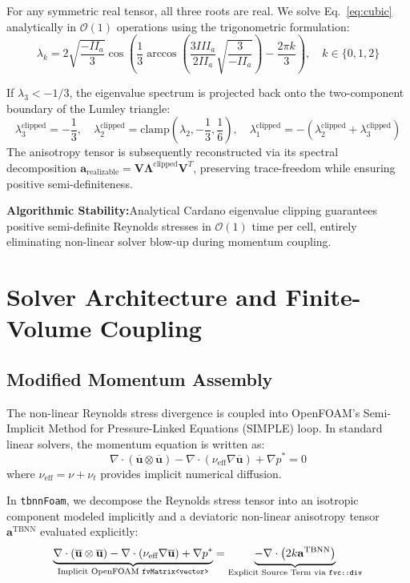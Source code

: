 \documentclass[11pt,a4paper]{article}
\newcommand{\takeaway}[2]{%
  \vspace{4pt}\noindent\colorbox{navyblue!6}{%
    \parbox{\dimexpr\textwidth-2\fboxsep\relax}{%
      \vspace{3pt}\textbf{\color{navyblue}#1:}\hspace{0.5em}#2\vspace{3pt}%
    }%
  }\vspace{4pt}%
}
\begin{document}
For any symmetric real tensor, all three roots are real. We solve Eq.~\ref{eq:cubic} analytically in $\mathcal{O}(1)$ operations using the trigonometric formulation:
\begin{equation}
\lambda_k = 2\sqrt{\frac{-II_a}{3}} \cos\left(\frac{1}{3}\arccos\left(\frac{3 III_a}{2 II_a}\sqrt{\frac{3}{-II_a}}\right) - \frac{2\pi k}{3}\right), \quad k \in \{0, 1, 2\}
\label{eq:cardano_roots}
\end{equation}

If $\lambda_3 < -1/3$, the eigenvalue spectrum is projected back onto the two-component boundary of the Lumley triangle:
\begin{equation}
\lambda_3^{\text{clipped}} = -\frac{1}{3}, \quad \lambda_2^{\text{clipped}} = \text{clamp}\left(\lambda_2, -\frac{1}{3}, \frac{1}{6}\right), \quad \lambda_1^{\text{clipped}} = -\left(\lambda_2^{\text{clipped}} + \lambda_3^{\text{clipped}}\right)
\end{equation}
The anisotropy tensor is subsequently reconstructed via its spectral decomposition $\mathbf{a}_{\text{realizable}} = \mathbf{V}\boldsymbol{\Lambda}^{\text{clipped}}\mathbf{V}^T$, preserving trace-freedom while ensuring positive semi-definiteness.

\takeaway{Algorithmic Stability}{Analytical Cardano eigenvalue clipping guarantees positive semi-definite Reynolds stresses in $\mathcal{O}(1)$ time per cell, entirely eliminating non-linear solver blow-up during momentum coupling.}

\section{Solver Architecture and Finite-Volume Coupling}

\subsection{Modified Momentum Assembly}
The non-linear Reynolds stress divergence is coupled into OpenFOAM's Semi-Implicit Method for Pressure-Linked Equations (SIMPLE) loop. In standard linear solvers, the momentum equation is written as:
\begin{equation}
\nabla \cdot (\overline{\mathbf{u}} \otimes \overline{\mathbf{u}}) - \nabla \cdot (\nu_{\text{eff}}\nabla \overline{\mathbf{u}}) + \nabla p^* = 0
\end{equation}
where $\nu_{\text{eff}} = \nu + \nu_t$ provides implicit numerical diffusion. 

In \texttt{tbnnFoam}, we decompose the Reynolds stress tensor into an isotropic component modeled implicitly and a deviatoric non-linear anisotropy tensor $\mathbf{a}^{\text{TBNN}}$ evaluated explicitly:
\begin{equation}
\underbrace{\nabla \cdot (\overline{\mathbf{u}} \otimes \overline{\mathbf{u}}) - \nabla \cdot (\nu_{\text{eff}}\nabla \overline{\mathbf{u}}) + \nabla p^*}_{\text{Implicit OpenFOAM \texttt{fvMatrix<vector>}}} = \underbrace{-\nabla \cdot \left(2k\mathbf{a}^{\text{TBNN}}\right)}_{\text{Explicit Source Term via \texttt{fvc::div}}}
\label{eq:openfoam_coupling}
\end{equation}
\end{document}
